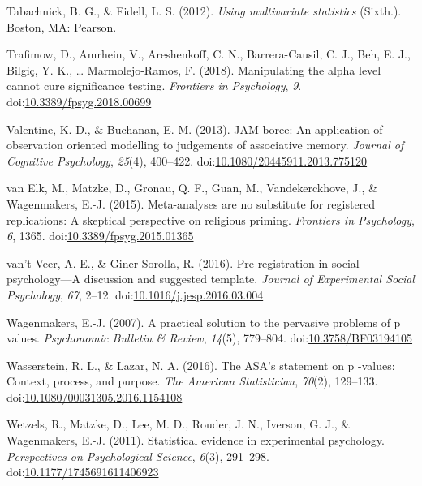 \documentclass[,man, mask]{apa6}
\theoremstyle{definition}
\theoremstyle{definition}
\theoremstyle{definition}
\theoremstyle{remark}
\begin{document}
\hypertarget{ref-Tabachnick2012}{}
Tabachnick, B. G., \& Fidell, L. S. (2012). \emph{Using multivariate
statistics} (Sixth.). Boston, MA: Pearson.

\hypertarget{ref-Trafimow2018}{}
Trafimow, D., Amrhein, V., Areshenkoff, C. N., Barrera-Causil, C. J.,
Beh, E. J., Bilgiç, Y. K., \ldots{} Marmolejo-Ramos, F. (2018).
Manipulating the alpha level cannot cure significance testing.
\emph{Frontiers in Psychology}, \emph{9}.
doi:\href{https://doi.org/10.3389/fpsyg.2018.00699}{10.3389/fpsyg.2018.00699}

\hypertarget{ref-Valentine2013}{}
Valentine, K. D., \& Buchanan, E. M. (2013). JAM-boree: An application
of observation oriented modelling to judgements of associative memory.
\emph{Journal of Cognitive Psychology}, \emph{25}(4), 400--422.
doi:\href{https://doi.org/10.1080/20445911.2013.775120}{10.1080/20445911.2013.775120}

\hypertarget{ref-VanElk2015}{}
van Elk, M., Matzke, D., Gronau, Q. F., Guan, M., Vandekerckhove, J., \&
Wagenmakers, E.-J. (2015). Meta-analyses are no substitute for
registered replications: A skeptical perspective on religious priming.
\emph{Frontiers in Psychology}, \emph{6}, 1365.
doi:\href{https://doi.org/10.3389/fpsyg.2015.01365}{10.3389/fpsyg.2015.01365}

\hypertarget{ref-VantVeer2016}{}
van't Veer, A. E., \& Giner-Sorolla, R. (2016). Pre-registration in
social psychology---A discussion and suggested template. \emph{Journal
of Experimental Social Psychology}, \emph{67}, 2--12.
doi:\href{https://doi.org/10.1016/j.jesp.2016.03.004}{10.1016/j.jesp.2016.03.004}

\hypertarget{ref-Wagenmakers2007}{}
Wagenmakers, E.-J. (2007). A practical solution to the pervasive
problems of p values. \emph{Psychonomic Bulletin \& Review},
\emph{14}(5), 779--804.
doi:\href{https://doi.org/10.3758/BF03194105}{10.3758/BF03194105}

\hypertarget{ref-Wasserstein2016}{}
Wasserstein, R. L., \& Lazar, N. A. (2016). The ASA's statement on p
-values: Context, process, and purpose. \emph{The American
Statistician}, \emph{70}(2), 129--133.
doi:\href{https://doi.org/10.1080/00031305.2016.1154108}{10.1080/00031305.2016.1154108}

\hypertarget{ref-Wetzels2011}{}
Wetzels, R., Matzke, D., Lee, M. D., Rouder, J. N., Iverson, G. J., \&
Wagenmakers, E.-J. (2011). Statistical evidence in experimental
psychology. \emph{Perspectives on Psychological Science}, \emph{6}(3),
291--298.
doi:\href{https://doi.org/10.1177/1745691611406923}{10.1177/1745691611406923}
\end{document}
